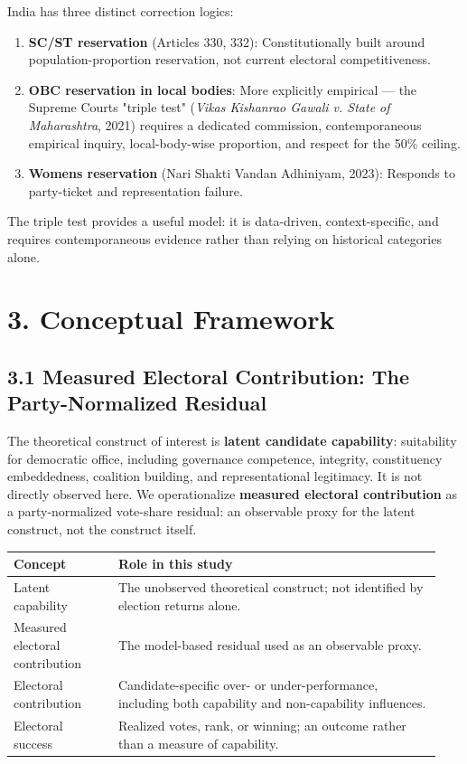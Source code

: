 \documentclass[
]{article}
\newcounter{none} %
\providecommand{\tightlist}{%
  \setlength{\itemsep}{0pt}\setlength{\parskip}{0pt}}
\begin{document}
India has three distinct correction logics:

\begin{enumerate}
\def\labelenumi{\arabic{enumi}.}
\tightlist
\item
  \textbf{SC/ST reservation} (Articles 330, 332): Constitutionally built around population-proportion reservation, not current electoral competitiveness.
\item
  \textbf{OBC reservation in local bodies}: More explicitly empirical --- the Supreme Court\textquotesingle s "triple test" (\emph{Vikas Kishanrao Gawali v. State of Maharashtra}, 2021) requires a dedicated commission, contemporaneous empirical inquiry, local-body-wise proportion, and respect for the 50\% ceiling.
\item
  \textbf{Women\textquotesingle s reservation} (Nari Shakti Vandan Adhiniyam, 2023): Responds to party-ticket and representation failure.
\end{enumerate}

The triple test provides a useful model: it is data-driven, context-specific, and requires contemporaneous evidence rather than relying on historical categories alone.

\section{3. Conceptual Framework}\label{3-conceptual-framework}

\subsection{3.1 Measured Electoral Contribution: The Party-Normalized Residual}\label{31-measured-electoral-contribution-the-party-normalized-residual}

The theoretical construct of interest is \textbf{latent candidate capability}: suitability for democratic office, including governance competence, integrity, constituency embeddedness, coalition building, and representational legitimacy. It is not directly observed here. We operationalize \textbf{measured electoral contribution} as a party-normalized vote-share residual: an observable proxy for the latent construct, not the construct itself.

{\def\LTcaptype{none} %
\begin{longtable}[]{@{}p{0.23\linewidth}p{0.71\linewidth}@{}}
\toprule\noalign{}
Concept & Role in this study \\
\midrule\noalign{}
\endhead
\bottomrule\noalign{}
\endlastfoot
Latent capability & The unobserved theoretical construct; not identified by election returns alone. \\
Measured electoral contribution & The model-based residual used as an observable proxy. \\
Electoral contribution & Candidate-specific over- or under-performance, including both capability and non-capability influences. \\
Electoral success & Realized votes, rank, or winning; an outcome rather than a measure of capability. \\
\end{longtable}
}
\end{document}
